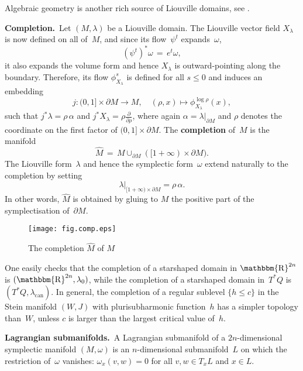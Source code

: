 \documentclass[12pt,twoside]{amsart}
\theoremstyle{plain}
\numberwithin{figure}{section}
\numberwithin{equation}{section}
\def\m{\medskip}
\def\can{\operatorname{can}}
\def\go{\omega}
\def\R{\operatorname{\mathbbm{R}}}
\def\pp{\partial}
\def\ni{\noindent}
\def\m{\medskip}
\begin{document}
Algebraic geometry is another rich source of Liouville domains, see \cite{sei08}. 

\m \ni
{\bf Completion.}\
Let $(M,\lambda)$ be a Liouville domain. The Liouville vector field $X_{\lambda}$ is now defined 
on all of~$M$, and since its flow~$\psi^t$ expands~$\omega$,
$$
(\psi^t)^* \omega \,=\, e^t \omega,
$$
it also expands the volume form and hence $X_\lambda$ is outward-pointing along the boundary. 
Therefore, its flow $\phi_{X_{\lambda}}^s$ is defined for all $s \leqslant 0$ and induces an embedding
\[
j \colon  (0,1] \times \partial M \rightarrow M, \quad (\rho,x) \mapsto \phi^{\log \rho}_{X_{\lambda}}(x),
\] 
such that $j^* \lambda = \rho \,\alpha$ and $j^* X_{\lambda} = \rho \frac{\partial}{\partial \rho}$,
where again $\alpha = \lambda |_{\pp M}$ and 
$\rho$ denotes the coordinate on the first factor of $(0,1] \times \partial M$. 
The {\bf completion} of~$M$ is the manifold
\[
\widehat{M} \,=\, M \cup_{\partial M} ( [1+\infty) \times \partial M).
\]
The Liouville form~$\lambda$ and hence the symplectic form~$\omega$ extend naturally to the completion by setting 
\[
\lambda|_{[1+\infty) \times \partial M} = \rho \,\alpha .
\]
In other words, $\widehat{M}$ is obtained by gluing to $M$ the positive part of the symplectisation 
of~$\partial M$.

\begin{figure}[h]   
 \begin{center}
  \psfrag{dM}{$\pp M$}
  \leavevmode\texttt{[image: fig.comp.eps]}
 \end{center}
 \caption{The completion $\widehat M$ of $M$}  \label{fig.comp}
\end{figure}

One easily checks that the completion of a starshaped domain in $\R^{2n}$ is $(\R^{2n},\lambda_0)$, 
while the completion of a starshaped domain in~$T^* Q$ is $(T^* Q,\lambda_{\can})$. 
In general, the completion of a regular sublevel $\{h \leqslant c\}$ in the Stein manifold $(W,J)$ with plurisubharmonic function~$h$ has a simpler topology than~$W$, 
unless $c$ is larger than the largest critical value of~$h$.


\m \ni
{\bf Lagrangian submanifolds.}\
A Lagrangian submanifold of a $2n$-dimensional symplectic manifold $(M,\go)$ is an $n$-dimensional submanifold~$L$ on which the restriction of~$\go$ vanishes:
$\go_x (v,w) = 0$ for all $v,w \in T_x L$ and $x \in L$.
\end{document}
